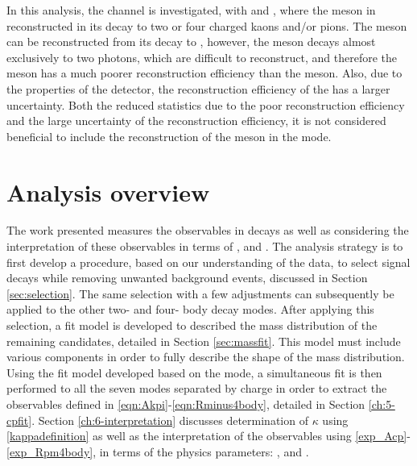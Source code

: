 In this analysis, the \decay{\Bm}{\D\Kstarm} channel is investigated, with \decay{\Kstarm}{\KS\pim} and \decay{\KS}{\pim\pip}, where the \Dz meson in reconstructed in its decay to two or four charged kaons and/or pions. The \Kstarm meson can be reconstructed from its decay to \Km\piz, however, the \piz meson decays almost exclusively to two photons, which are difficult to reconstruct, and therefore the \piz meson has a much poorer reconstruction efficiency than the \KS meson. Also, due to the properties of the detector, the reconstruction efficiency of the \piz has a larger uncertainty. Both the reduced statistics due to the poor reconstruction efficiency and the large uncertainty of the reconstruction efficiency, it is not considered beneficial to include the reconstruction of the \Kstarm meson in the \Km\piz mode.

\section{Analysis overview}

The work presented measures the \CP observables in \decay{\Bm}{\D\Kstarm} decays as well as considering the interpretation of these observables in terms of \rb, \deltab and \Pgamma. The analysis strategy is to first develop a procedure, based on our understanding of the data, to select \decay{\Bm}{\D(\Km\pip)\Kstarm} signal decays while removing unwanted background events, discussed in Section \ref{sec:selection}. The same selection with a few adjustments can subsequently be applied to the other two- and four- body \D decay modes. After applying this selection, a fit model is developed to described the \B mass distribution of the remaining \decay{\Bm}{\D(\Km\pip)\Kstarm} candidates, detailed in Section \ref{sec:massfit}. This model must include various components in order to fully describe the shape of the \B mass distribution. Using the fit model developed based on the \decay{\Bm}{\D(\Km\pip)\Kstarm} mode, a simultaneous fit is then performed to all the seven \D modes separated by \B charge in order to extract the \CP observables defined in \eqn\ref{eqn:Akpi}-\ref{eqn:Rminus4body}, detailed in Section \ref{ch:5-cpfit}. Section \ref{ch:6-interpretation} discusses determination of $\kappa$ using \eqn\ref{kappadefinition} as well as the interpretation of the \CP observables using \eqn\ref{exp_Acp}-\ref{exp_Rpm4body}, in terms of the physics parameters: \rb, \deltab and \Pgamma.